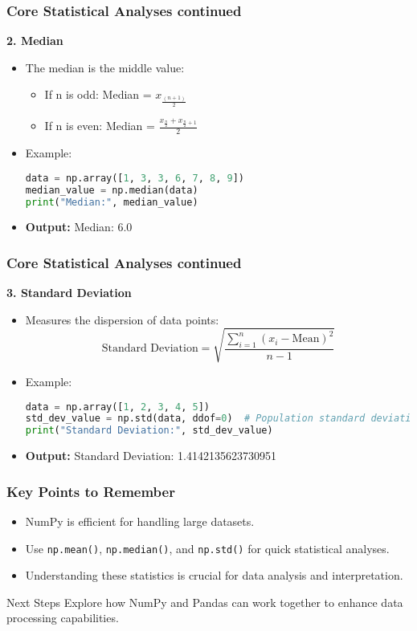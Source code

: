 \documentclass[aspectratio=169]{beamer}
\begin{document}
\begin{frame}
    \frametitle{Core Statistical Analyses continued}
    \textbf{2. Median}
    \begin{itemize}
        \item The median is the middle value:
        \begin{itemize}
            \item If n is odd: Median = \(x_{\frac{(n+1)}{2}}\)
            \item If n is even: Median = \(\frac{x_{\frac{n}{2}} + x_{\frac{n}{2} + 1}}{2}\)
        \end{itemize}
        \item Example:
        \begin{lstlisting}[language=Python]
data = np.array([1, 3, 3, 6, 7, 8, 9])
median_value = np.median(data)
print("Median:", median_value)
        \end{lstlisting}
        \item \textbf{Output:} Median: 6.0
    \end{itemize}
\end{frame}

\begin{frame}
    \frametitle{Core Statistical Analyses continued}
    \textbf{3. Standard Deviation}
    \begin{itemize}
        \item Measures the dispersion of data points:
        \begin{equation}
            \text{Standard Deviation} = \sqrt{\frac{\sum_{i=1}^{n} (x_i - \text{Mean})^2}{n-1}}
        \end{equation}
        \item Example:
        \begin{lstlisting}[language=Python]
data = np.array([1, 2, 3, 4, 5])
std_dev_value = np.std(data, ddof=0)  # Population standard deviation
print("Standard Deviation:", std_dev_value)
        \end{lstlisting}
        \item \textbf{Output:} Standard Deviation: 1.4142135623730951
    \end{itemize}
\end{frame}

\begin{frame}
    \frametitle{Key Points to Remember}
    \begin{itemize}
        \item NumPy is efficient for handling large datasets.
        \item Use \texttt{np.mean()}, \texttt{np.median()}, and \texttt{np.std()} for quick statistical analyses.
        \item Understanding these statistics is crucial for data analysis and interpretation.
    \end{itemize}
    \begin{block}{Next Steps}
        Explore how NumPy and Pandas can work together to enhance data processing capabilities.
    \end{block}
\end{frame}
\end{document}
